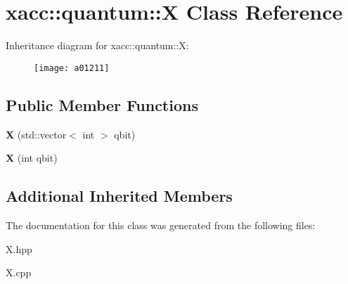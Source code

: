 \hypertarget{a01211}{}\section{xacc\+:\+:quantum\+:\+:X Class Reference}
\label{a01211}
Inheritance diagram for xacc\+:\+:quantum\+:\+:X\+:\begin{figure}[H]
\begin{center}
\leavevmode
\texttt{[image: a01211]}
\end{center}
\end{figure}
\subsection*{Public Member Functions}
\begin{DoxyCompactItemize}
\item 
\mbox{\label{a01211_aedc541a302602154847118f73b040510}} 
{\bfseries X} (std\+::vector$<$ int $>$ qbit)
\item 
\mbox{\label{a01211_a1159bd01929b59277b4524ccfcfd7440}} 
{\bfseries X} (int qbit)
\end{DoxyCompactItemize}
\subsection*{Additional Inherited Members}


The documentation for this class was generated from the following files\+:\begin{DoxyCompactItemize}
\item 
X.\+hpp\item 
X.\+cpp\end{DoxyCompactItemize}
